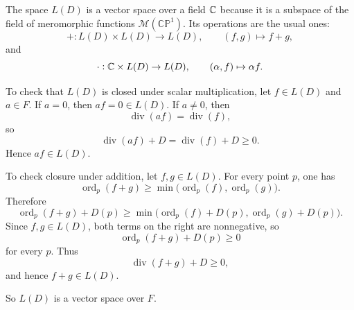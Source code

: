 \documentclass[11pt,openany]{article}
\newcommand{\CP}{\mathbb{CP}}
\begin{document}
\newpage
\begin{remark}
The space $L(D)$ is a vector space over a field $\mathbb{C}$ because it is a subspace of the field of meromorphic functions $\mathcal{M}(\CP^1)$. Its operations are the usual ones:
\[
+:L(D)\times L(D)\to L(D),\qquad (f,g)\mapsto f+g,
\]
and
\[
\cdot:\mathbb{C}\times L(D)\to L(D),\qquad (\alpha,f)\mapsto \alpha f.
\]

To check that $L(D)$ is closed under scalar multiplication, let $f\in L(D)$ and $a\in F$. If $a=0$, then $af=0\in L(D)$. If $a\neq 0$, then
\[
\operatorname{div}(af)=\operatorname{div}(f),
\]
so
\[
\operatorname{div}(af)+D=\operatorname{div}(f)+D\ge 0.
\]
Hence $af\in L(D)$.

To check closure under addition, let $f,g\in L(D)$. For every point $p$, one has
\[
\operatorname{ord}_p(f+g)\ge \min\bigl(\operatorname{ord}_p(f),\operatorname{ord}_p(g)\bigr).
\]
Therefore
\[
\operatorname{ord}_p(f+g)+D(p)
\ge
\min\bigl(\operatorname{ord}_p(f)+D(p),\operatorname{ord}_p(g)+D(p)\bigr).
\]
Since $f,g\in L(D)$, both terms on the right are nonnegative, so
\[
\operatorname{ord}_p(f+g)+D(p)\ge 0
\]
for every $p$. Thus
\[
\operatorname{div}(f+g)+D\ge 0,
\]
and hence $f+g\in L(D)$.

So $L(D)$ is a vector space over $F$.
\end{remark}
\end{document}

